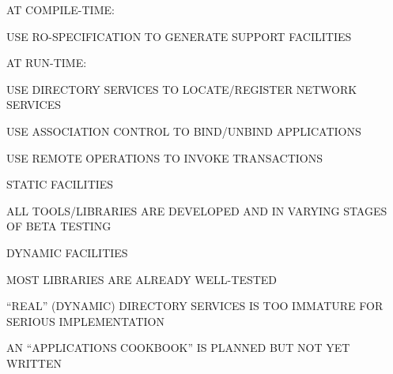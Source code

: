 \begin{bwslide}

\begin{nrtc}
\item	AT COMPILE-TIME:
    \begin{nrtc}
    \item	USE RO-SPECIFICATION TO GENERATE SUPPORT FACILITIES
    \end{nrtc}

\item	AT RUN-TIME:
    \begin{nrtc}
    \item	USE DIRECTORY SERVICES TO LOCATE/REGISTER NETWORK SERVICES

    \item	USE ASSOCIATION CONTROL TO BIND/UNBIND APPLICATIONS

    \item	USE REMOTE OPERATIONS TO INVOKE TRANSACTIONS
    \end{nrtc}
\end{nrtc}
\end{bwslide}






\begin{bwslide}

\begin{nrtc}
\item	STATIC FACILITIES
    \begin{nrtc}
    \item	ALL TOOLS/LIBRARIES ARE DEVELOPED AND IN VARYING STAGES OF
		BETA TESTING
    \end{nrtc}

\item	DYNAMIC FACILITIES
    \begin{nrtc}
    \item	MOST LIBRARIES ARE ALREADY WELL-TESTED

    \item	``REAL'' (DYNAMIC) DIRECTORY SERVICES IS TOO IMMATURE
		FOR SERIOUS IMPLEMENTATION
    \end{nrtc}

\item	AN ``APPLICATIONS COOKBOOK'' IS PLANNED BUT NOT YET WRITTEN
\end{nrtc}
\end{bwslide}



